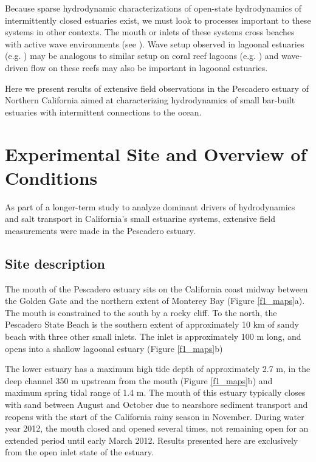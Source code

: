 Because sparse hydrodynamic characterizations of open-state hydrodynamics
of intermittently closed estuaries exist, we must look to processes
important to these systems in other contexts. The mouth or inlets
of these systems cross beaches with active wave environments (see
\cite{mei_surface_1993,battjes_surf-zone_1988}). Wave setup observed in lagoonal
estuaries (e.g. \cite{malhadas_effect_2009}) may be analogous
to similar setup on coral reef lagoons (e.g. \cite{becker_water_2014})
and wave-driven flow on these reefs \parencite{monismith_hydrodynamics_2007} may also
be important in lagoonal estuaries. 

Here we present results of extensive field observations in the Pescadero
estuary of Northern California aimed at characterizing hydrodynamics
of small bar-built estuaries with intermittent connections to the
ocean. 



\section{Experimental Site and Overview of Conditions}

As part of a longer-term study to analyze dominant drivers of hydrodynamics
and salt transport in California's small estuarine systems, extensive
field measurements were made in the Pescadero estuary.


\subsection{Site description }

The mouth of the Pescadero estuary sits on the California coast midway
between the Golden Gate and the northern extent of Monterey Bay (Figure
\ref{f1_maps}a). The mouth is constrained to the south by a rocky
cliff. To the north, the Pescadero State Beach is the southern extent
of approximately 10 km of sandy beach with three other small inlets.
The inlet is approximately 100 m long, and opens into a shallow lagoonal
estuary (Figure \ref{f1_maps}b) 

The lower estuary has a maximum high tide depth of approximately 2.7
m, in the deep channel 350 m upstream from the mouth (Figure \ref{f1_maps}b) and maximum spring tidal range of 1.4 m. The mouth of this estuary
typically closes with sand between August and October due to nearshore
sediment transport and reopens with the start of the California rainy
season in November. During water year 2012, the mouth closed and opened
several times, not remaining open for an extended period until early
March 2012. Results presented here are exclusively from the open inlet
state of the estuary. 

